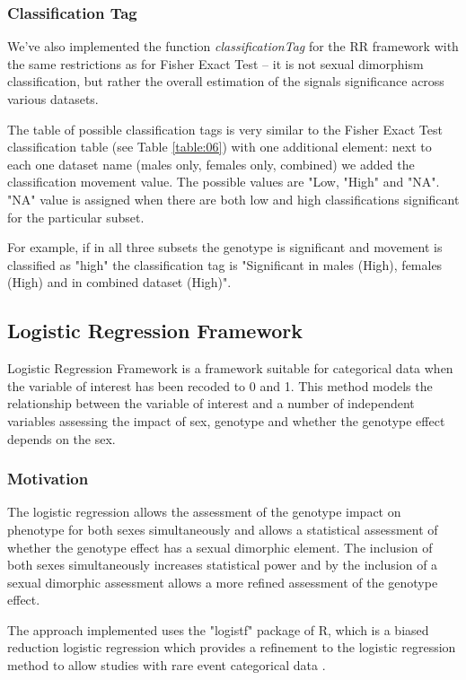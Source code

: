 \documentclass[12pt,a4paper]{article}
\begin{document}
\subsubsection{Classification Tag}
We've also implemented the function \textit{classificationTag}  for the RR framework with the same restrictions as for Fisher Exact Test -- it is not sexual dimorphism classification, but rather the overall estimation of the signals significance across various datasets.

The table of possible classification tags is very similar to the Fisher Exact Test classification table (see Table \ref{table:06}) with one additional element: next to each one dataset name (males only, females only, combined) we added the classification movement value. The possible values are "Low, "High" and "NA". "NA" value is assigned when there are both low and high classifications significant for the particular subset.

For example, if in all three subsets the genotype is significant and movement is classified as "high" the classification tag is "Significant in males (High), females (High) and in combined dataset (High)".

\subsection{Logistic Regression Framework}
Logistic Regression Framework is a framework suitable for categorical data when the variable of interest has been recoded to 0 and 1. This method models the relationship between the variable of interest and a number of independent variables assessing the impact of sex, genotype and whether the genotype effect depends on the sex.   

\subsubsection{Motivation}
The logistic regression allows the assessment of the genotype impact on phenotype for both sexes simultaneously and allows a statistical assessment of whether the genotype effect has a sexual dimorphic element. The inclusion of both sexes simultaneously increases statistical power and by the inclusion of a sexual dimorphic assessment allows a more refined assessment of the genotype effect.  

The approach implemented uses the "logistf" package of R, which is a biased reduction logistic regression which provides a refinement to the logistic regression method to allow studies with rare event categorical data \cite{Heinze}.   
\end{document}
